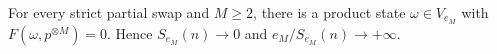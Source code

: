 \begin{proposition}\label{prop:capable}
For every strict partial swap and $M\ge2$, there is a product state $\omega\in V_{e_M}$ with $F(\omega,p^{\otimes M})=0$. Hence $S_{e_M}(n)\to0$ and $e_M/S_{e_M}(n)\to+\infty$.
\end{proposition}
